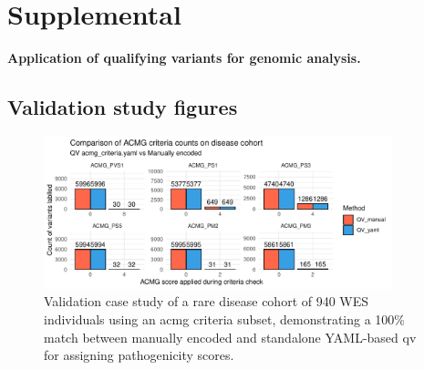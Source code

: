 
 
\clearpage
\FloatBarrier

\beginsupplement
\section{Supplemental} \label{Supplemental_text}
\textbf{Application of qualifying variants for genomic analysis.}

\subsection{Validation study figures}

\begin{figure}[h]
\centering
\includegraphics[width=0.9\textwidth]{./images/Guru_singlecase_validation_of_yaml_vs_manual.pdf}
\caption{Validation case study of a rare disease cohort of 940 WES individuals using an \ac{acmg} criteria subset, demonstrating a 100\% match between manually encoded and standalone YAML-based \ac{qv} for assigning pathogenicity scores.}
\label{fig:guru_singlecase_validation_of_yaml_vs_manual}
\end{figure}


